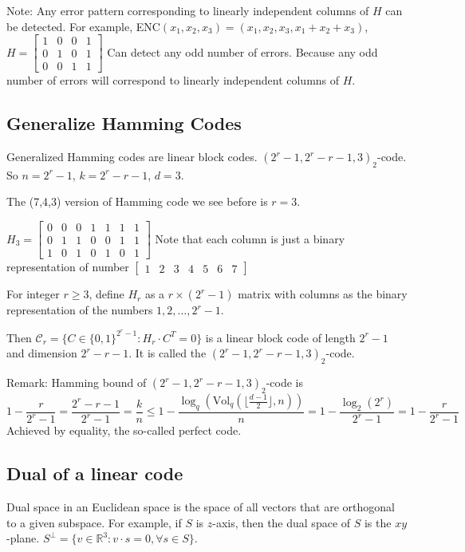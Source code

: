 \documentclass[letterpaper,12pt]{article}
\begin{document}
Note: Any error pattern corresponding to linearly independent columns of $H$
can be detected. For example, ENC$(x_1,x_2,x_3)=(x_1,x_2,x_3,x_1+x_2+x_3)$, $H=\begin{bmatrix}
        1 & 0 & 0 & 1 \\
        0 & 1 & 0 & 1 \\
        0 & 0 & 1 & 1
    \end{bmatrix}$
Can detect any odd number of errors. Because any odd number of errors will correspond to linearly independent columns of $H$.

\subsection{Generalize Hamming Codes}
Generalized Hamming codes are linear block codes. $(2^r-1, 2^r-r-1,3)_2$-code.
So $n=2^r-1$, $k=2^r-r-1$, $d=3$.

The (7,4,3) version of Hamming code we see before is $r=3$.

$H_3 = \begin{bmatrix}
        0 & 0 & 0 & 1 & 1 & 1 & 1 \\
        0 & 1 & 1 & 0 & 0 & 1 & 1 \\
        1 & 0 & 1 & 0 & 1 & 0 & 1
    \end{bmatrix}$ Note that each column is just a binary representation of number $\begin{bmatrix}
        1 & 2 & 3 & 4 & 5 & 6 & 7
    \end{bmatrix}$

For integer $r\ge 3$, define $H_r$ as a $r\times (2^r-1)$ matrix with columns
as the binary representation of the numbers $1,2,\ldots,2^r-1$.

Then $\mathcal{C}_r = \{C\in \{0,1\}^{2^r-1}: H_r\cdot C^T=0\}$ is a linear
block code of length $2^r-1$ and dimension $2^r-r-1$. It is called the $(2^r-1,
    2^r-r-1,3)_2$-code.

Remark: Hamming bound of $(2^r-1, 2^r-r-1,3)_2$-code is \[
    1-\frac{r}{2^r-1}=\frac{2^r-r-1}{2^r-1}=\frac{k}{n}\le 1-\frac{\log_q(\text{Vol}_q(\lfloor \frac{d-1}{2}\rfloor,n))}{n}=1-\frac{\log_2(2^r)}{2^r-1}=1-\frac{r}{2^r-1}
\]
Achieved by equality, the so-called perfect code.
\subsection{Dual of a linear code}
Dual space in an Euclidean space is the space of all vectors that are
orthogonal to a given subspace. For example, if $S$ is $z$-axis, then the dual
space of $S$ is the $xy$-plane. $S^{\perp}=\{v\in \mathbb{R}^3: v\cdot s=0,
    \forall s\in S\}$.
\end{document}
